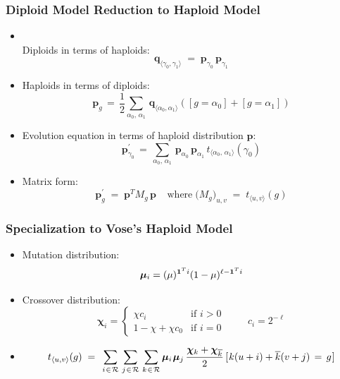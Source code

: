 \documentclass[aspectratio=169]{beamer}
\newcommand{\nudge}{\hspace{0.01in}}
\begin{document}
  \begin{frame}
    \frametitle{ Diploid Model Reduction to Haploid Model}
    {
    \begin{itemize}
      \item{ \mbox{}\\[0.1in]
      Diploids in terms of haploids:
      \[\bm{q}_{\langle \gamma_0, \gamma_1 \rangle}\; = \;
      \bm{p}_{\gamma_0} \, \bm{p}_{\gamma_1}\]}
      \item{Haploids in terms of diploids:
      \[ \bm{p}_g \, = \, \frac{1}{2} \sum_{\alpha_0, \, \alpha_1} \, \bm{q}_{\langle \alpha_0, \alpha_1 \rangle}
	    ([g = \alpha_0] + [g = \alpha_1]) \]}
      \item{Evolution equation in terms of haploid distribution $\bm{p}$:
      \[\bm{p}_{\gamma_0}^{\prime} \,=\, \sum_{\alpha_0, \, \alpha_1} \, \bm{p}_{\alpha_0} \, \bm{p}_{\alpha_1} \,
	  t_{\langle \alpha_0, \,\alpha_1 \rangle}(\gamma_0) \]}
      \item{Matrix form:
      \[ \bm{p}_g^\prime \; = \; \bm{p}^T M_g \, \bm{p} \;\;\;\; \text{where} \; \Big(M_g \Big)_{u,v} \; = \; t_{\langle u, v \rangle}(g) \]}
    \end{itemize}
    }
  \end{frame}
  
  \begin{frame}
    \frametitle{ Specialization to Vose's Haploid Model}
    \begin{itemize}
      \item{Mutation distribution: \[\bm{\mu}_i = (\mu)^{{\bf 1}^Ti} (1-\mu)^{\ell- {\bf 1}^Ti} \]}
      \item{Crossover distribution: \[
	\bm{\chi}_i =\begin{cases}
	  \chi c_i & \text{if $i>0$}\\
	  1 - \chi + \chi  c_0 & \text{if $i = 0$} \; 
	\end{cases}
	\quad \quad c_i = 2^{-\ell}
      \]
      }      
      \item{\[ t_{\langle u,v \rangle}(g) \; = \;\,
      \sum_{i \nudge \in \nudge \mathcal{R}} \, \sum_{j \nudge \in \nudge \mathcal{R}} \,
      \sum_{k \nudge \in \nudge \mathcal{R}}
      \bm{\mu}_i \nudge \bm{\mu}_j \, \frac{\bm{\chi}_k + \bm{\chi}_{\overline{k}}}{2} \,
      [\nudge k (u + i) + \overline{k}(v + j) \, = \, g\nudge]  \] %
      
      }
    \end{itemize}
  \end{frame}
  
\end{document}
